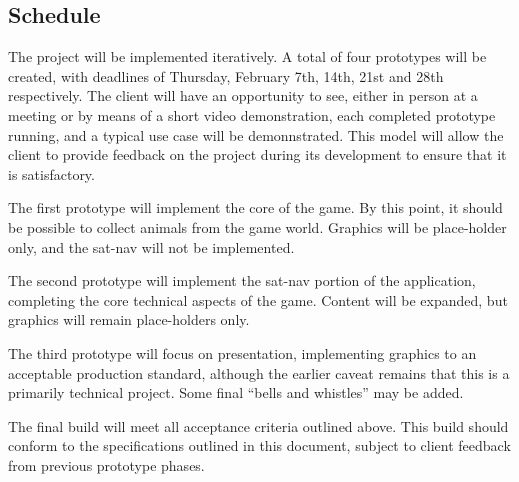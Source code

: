 \documentclass[12pt,a4paper,twoside]{article}
\begin{document}
\subsection{Schedule}
The project will be implemented iteratively.
A total of four prototypes will be created, with deadlines of Thursday, February 7th, 14th, 21st and 28th respectively.
The client will have an opportunity to see, either in person at a meeting or by means of a short video demonstration, each completed prototype running, and a typical use case will be demonnstrated.
This model will allow the client to provide feedback on the project during its development to ensure that it is satisfactory.

The first prototype will implement the core of the game. By this point, it should be possible to collect animals from the game world. Graphics will be place-holder only, and the sat-nav will not be implemented.

The second prototype will implement the sat-nav portion of the application, completing the core technical aspects of the game. Content will be expanded, but graphics will remain place-holders only.

The third prototype will focus on presentation, implementing graphics to an acceptable production standard, although the earlier caveat remains that this is a primarily technical project. Some final ``bells and whistles'' may be added.

The final build will meet all acceptance criteria outlined above. This build should conform to the specifications outlined in this document, subject to client feedback from previous prototype phases.
\end{document}
